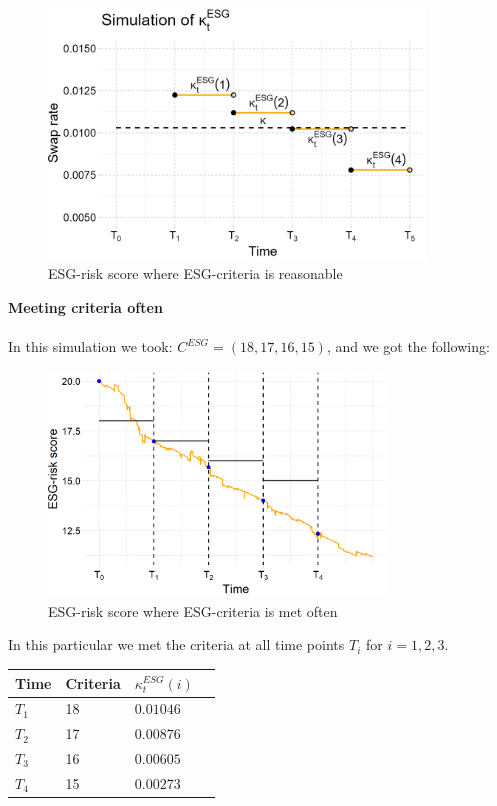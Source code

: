 \begin{figure}[htp]
    \centering
    \includegraphics[width= 10cm]{figures/ESG/kappa_t_ESG_1.png}
    \caption{ESG-risk score where ESG-criteria is reasonable}
    \label{fig: ESG_swap_1}
\end{figure}

\newpage 

\textbf{Meeting criteria often}
\\~\\ 
In this simulation we took: $C^{ESG} = (18,17,16,15)$, and we got the following: 

\begin{figure}[htp]
    \centering
    \includegraphics[width= 9cm]{figures/ESG/ESG_plt_criteria2.png}
    \caption{ESG-risk score where ESG-criteria is met often}
    \label{fig: ESG-risk_score_criteri2}
\end{figure}

In this particular we met the criteria at all time points $T_{i}$ for $i=1,2,3$. 


\begin{center}
    \begin{tabular}{ | l | l | l | p{5cm} |}
    \hline
    Time    & Criteria   & $\kappa_{t}^{ESG}(i)$ \\ \hline
    $T_{1}$ &   18       & $0.01046$  \\ \hline
    $T_{2}$ &   17       & $0.00876$  \\ \hline
    $T_{3}$ &   16       & $0.00605$\\ \hline
    $T_{4}$ &   15       & $0.00273$ \\ \hline
    \end{tabular}
\end{center} 

